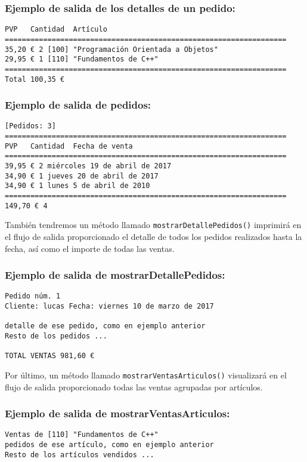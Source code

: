 \subsubsection*{Ejemplo de salida de los detalles de un pedido:}
\begin{center}
  \begin{verbatim}
PVP   Cantidad  Artículo
==================================================================
35,20 € 2 [100] "Programación Orientada a Objetos"
29,95 € 1 [110] "Fundamentos de C++"
==================================================================
Total 100,35 €
  \end{verbatim}
\end{center}
\subsubsection{Ejemplo de salida de pedidos:}
\begin{center}
  \begin{verbatim}
[Pedidos: 3]
==================================================================
PVP   Cantidad  Fecha de venta
==================================================================
39,95 € 2 miércoles 19 de abril de 2017
34,90 € 1 jueves 20 de abril de 2017
34,90 € 1 lunes 5 de abril de 2010
==================================================================
149,70 € 4
  \end{verbatim}
\end{center}

También tendremos un método llamado \texttt{mostrarDetallePedidos()} imprimirá en el flujo de salida proporcionado el detalle de todos los pedidos realizados hasta la fecha, así como el importe de todas las ventas.
\subsubsection*{Ejemplo de salida de mostrarDetallePedidos:}
\begin{center}
  \begin{verbatim}
Pedido núm. 1
Cliente: lucas Fecha: viernes 10 de marzo de 2017

detalle de ese pedido, como en ejemplo anterior
Resto de los pedidos ...

TOTAL VENTAS 981,60 €
  \end{verbatim}
\end{center}

Por último, un método llamado \texttt{mostrarVentasArticulos()} visualizará en el flujo de salida proporcionado todas las ventas agrupadas por artículos.\subsubsection*{Ejemplo de salida de mostrarVentasArticulos:}
\begin{center}
  \begin{verbatim}
Ventas de [110] "Fundamentos de C++"
pedidos de ese artículo, como en ejemplo anterior
Resto de los artículos vendidos ...
  \end{verbatim}
\end{center}
